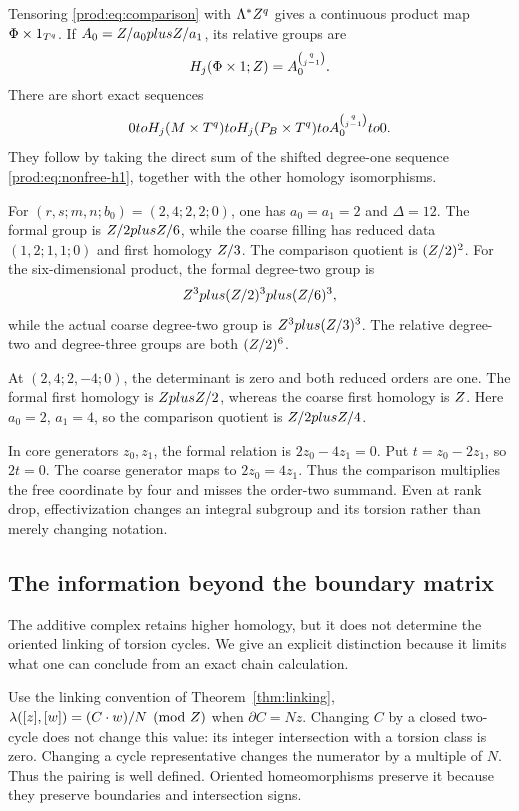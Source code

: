 Tensoring \eqref{prod:eq:comparison} with $\Lambda^*Z^q$ gives a
continuous product map $\Phi\times1_{T^q}$.
If $A_0=Z/a_0plusZ/a_1$, its relative groups are
\begin{equation}\label{prod:eq:relative-product}
                   H_j(\Phi\times1;Z)=A_0^{\binom q{j-1}}.
\end{equation}
There are short exact sequences
\[
 0to H_j(M\times T^q)to H_j(P_B\times T^q)
          to A_0^{\binom q{j-1}}to0.
\]
They follow by taking the direct sum of the shifted degree-one sequence
\eqref{prod:eq:nonfree-h1}, together with the other homology isomorphisms.

\begin{example}\label{prod:ex:nonfree}
For $(r,s;m,n;b_0)=(2,4;2,2;0)$, one has
$a_0=a_1=2$ and $\Delta=12$.
The formal group is $Z/2plusZ/6$, while the coarse filling has
reduced data $(1,2;1,1;0)$ and first homology $Z/3$.
The comparison quotient is $(Z/2)^2$.
For the six-dimensional product, the formal degree-two group is
\[
 Z^3plus(Z/2)^3plus(Z/6)^3,
\]
while the actual coarse degree-two group is $Z^3plus(Z/3)^3$.
The relative degree-two and degree-three groups are both $(Z/2)^6$.

At $(2,4;2,-4;0)$, the determinant is zero and both reduced orders
are one.  The formal first homology is $ZplusZ/2$,
whereas the coarse first homology is $Z$.
Here $a_0=2$, $a_1=4$, so the comparison quotient is
$Z/2plusZ/4$.

In core generators $z_0,z_1$, the formal relation is
$2z_0-4z_1=0$.  Put $t=z_0-2z_1$, so $2t=0$.
The coarse generator maps to $2z_0=4z_1$.
Thus the comparison multiplies the free coordinate by four and misses
the order-two summand.
Even at rank drop, effectivization changes an integral subgroup
and its torsion rather than merely changing notation.
\end{example}

\subsection{The information beyond the boundary matrix}

The additive complex retains higher homology, but it does not determine
the oriented linking of torsion cycles.  We give an explicit distinction
because it limits what one can conclude from an exact chain calculation.

Use the linking convention of Theorem~\ref{thm:linking},
$\lambda([z],[w])=(C\cdot w)/N\pmod{Z}$ when $\partial C=Nz$.
Changing $C$ by a closed two-cycle does not change this value: its
integer intersection with a torsion class is zero.
Changing a cycle representative changes the numerator by a multiple
of $N$.  Thus the pairing is well defined.  Oriented homeomorphisms
preserve it because they preserve boundaries and intersection signs.

